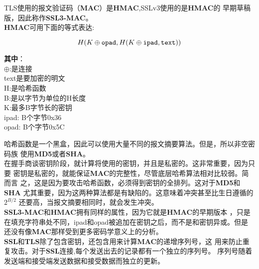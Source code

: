 \documentclass[11pt]{article}
\newcommand{\bfs}[1]{{\bf{#1}}}
\begin{document}
TLS使用的报文验证码（{\bf{MAC}}）是{\bf{HMAC}},SSLv3使用的是{\bf{HMAC}}的
早期草稿版，因此称作{\bf{SSL3-MAC}}。\\

{\bf{HMAC}}可用下面的等式表达:

\begin{displaymath}
        H(K \oplus {\tt{opad}},H(K \oplus {\tt{ipad}},{\tt{text}}))\\{}
 \end{displaymath}

 \begin{center}
         \begin{minipage}[t]{0.30\textwidth}
                 {\bf{其中}}：\\

        $\oplus$:是连接\\
        text是要加密的明文\\
        H:是哈希函数\\
        B:是以字节为单位的H长度\\
        K:最多B字节长的密钥\\
        ipad:   B个字节0x36\\
        opad:   B个字节0x5C\\
\end{minipage}
\end{center}


哈希函数是一个黑盒，因此可以使用大量不同的报文摘要算法。但是，所以非空密码族
使用{\bf{MD5}}或者{\bf{SHA}}。\\

在握手商谈密钥阶段，就计算将使用的密钥，并且是私密的。这非常重要，因为只要
密钥是私密的，就能保证{\bf{MAC}}的完整性，尽管底层哈希算法相对比较弱。简而言
之，这是因为要攻击哈希函数，必须得到密钥的全排列。这对于{\bf{MD5}}和{\bf{SHA}}
尤其重要，因为这两种算法都是有缺陷的。这意味着冲突甚至比生日遵循的$2^{B/2}$
还要高，当报文摘要相同时，就会发生冲突。\\

{\bf{SSL3-MAC}}和{\bf{HMAC}}拥有同样的属性，因为它就是{\bf{HMAC}}的早期版本
，只是在填充字符串处不同，ipad和opad被追加在密钥之后，而不是和密钥异或。但是
还没有像{\bf{MAC}}那样受到更多密码学意义上的分析。 \\

\bfs{SSL}和\bfs{TLS}除了包含密钥，还包含用来计算\bfs{MAC}的递增序列号，这
用来防止重复攻击。对于\bfs{SSL}连接,每个发送出去的记录都有一个独立的序列号。
序列号随着发送端和接受端发送数据和接受数据而独立的更新。\\
\end{document}
